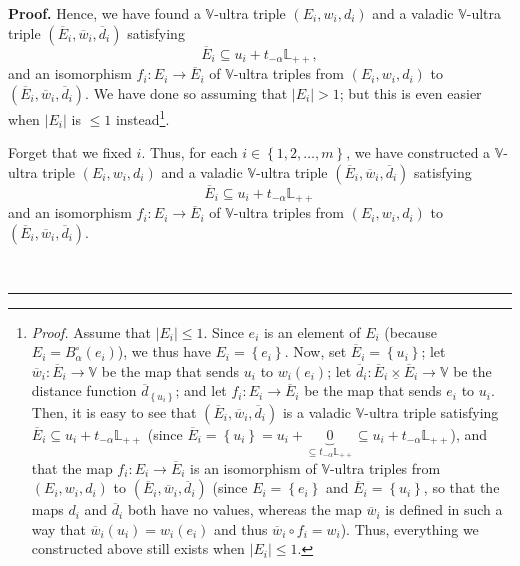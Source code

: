 \documentclass[numbers=enddot,12pt,final,onecolumn,notitlepage]{scrartcl}%
\theoremstyle{definition}
\newenvironment{proof}[1][Proof]{\noindent\textbf{#1.} }{\ \rule{0.5em}{0.5em}}
\newcommand{\timesu}{\mathbin{\underline{\times}}}
\renewcommand{\leq}{\leqslant}
\theoremstyle{plainsl}
\begin{document}
\begin{proof}
Hence, we have found a $\mathbb{V}$-ultra triple $\left(  E_{i},w_{i}%
,d_{i}\right)  $ and a valadic $\mathbb{V}$-ultra triple $\left(  \overline
{E}_{i},\overline{w}_{i},\overline{d}_{i}\right)  $ satisfying
\[
\overline{E}_{i}\subseteq u_{i}+t_{-\alpha}\mathbb{L}_{++},
\]
and an isomorphism $f_{i}:E_{i}\rightarrow\overline{E}_{i}$ of $\mathbb{V}%
$-ultra triples from $\left(  E_{i},w_{i},d_{i}\right)  $ to $\left(
\overline{E}_{i},\overline{w}_{i},\overline{d}_{i}\right)  $. We have done so
assuming that $\left\vert E_{i}\right\vert >1$; but this is even easier when
$\left\vert E_{i}\right\vert $ is $\leq1$ instead\footnote{\textit{Proof.}
Assume that $\left\vert E_{i}\right\vert \leq1$. Since $e_{i}$ is an element
of $E_{i}$ (because $E_{i}=B_{\alpha}^{\circ}\left(  e_{i}\right)  $), we thus
have $E_{i}=\left\{  e_{i}\right\}  $. Now, set $\overline{E}_{i}=\left\{
u_{i}\right\}  $; let $\overline{w}_{i}:\overline{E}_{i}\rightarrow\mathbb{V}$
be the map that sends $u_{i}$ to $w_{i}\left(  e_{i}\right)  $; let
$\overline{d}_{i}:\overline{E}_{i}\timesu\overline{E}_{i}\rightarrow
\mathbb{V}$ be the distance function $\overline{d}_{\left\{  u_{i}\right\}  }%
$; and let $f_{i}:E_{i}\rightarrow\overline{E}_{i}$ be the map that sends
$e_{i}$ to $u_{i}$. Then, it is easy to see that $\left(  \overline{E}%
_{i},\overline{w}_{i},\overline{d}_{i}\right)  $ is a valadic $\mathbb{V}%
$-ultra triple satisfying $\overline{E}_{i}\subseteq u_{i}+t_{-\alpha
}\mathbb{L}_{++}$ (since $\overline{E}_{i}=\left\{  u_{i}\right\}
=u_{i}+\underbrace{0}_{\subseteq t_{-\alpha}\mathbb{L}_{++}}\subseteq
u_{i}+t_{-\alpha}\mathbb{L}_{++}$), and that the map $f_{i}:E_{i}%
\rightarrow\overline{E}_{i}$ is an isomorphism of $\mathbb{V}$-ultra triples
from $\left(  E_{i},w_{i},d_{i}\right)  $ to $\left(  \overline{E}%
_{i},\overline{w}_{i},\overline{d}_{i}\right)  $ (since $E_{i}=\left\{
e_{i}\right\}  $ and $\overline{E}_{i}=\left\{  u_{i}\right\}  $, so that the
maps $d_{i}$ and $\overline{d}_{i}$ both have no values, whereas the map
$\overline{w}_{i}$ is defined in such a way that $\overline{w}_{i}\left(
u_{i}\right)  =w_{i}\left(  e_{i}\right)  $ and thus $\overline{w}_{i}\circ
f_{i}=w_{i}$). Thus, everything we constructed above still exists when
$\left\vert E_{i}\right\vert \leq1$.}.

Forget that we fixed $i$. Thus, for each $i\in\left\{  1,2,\ldots,m\right\}
$, we have constructed a $\mathbb{V}$-ultra triple $\left(  E_{i},w_{i}%
,d_{i}\right)  $ and a valadic $\mathbb{V}$-ultra triple $\left(  \overline
{E}_{i},\overline{w}_{i},\overline{d}_{i}\right)  $ satisfying
\[
\overline{E}_{i}\subseteq u_{i}+t_{-\alpha}\mathbb{L}_{++}%
\]
and an isomorphism $f_{i}:E_{i}\rightarrow\overline{E}_{i}$ of $\mathbb{V}%
$-ultra triples from $\left(  E_{i},w_{i},d_{i}\right)  $ to $\left(
\overline{E}_{i},\overline{w}_{i},\overline{d}_{i}\right)  $.


\end{proof}
\end{document}

